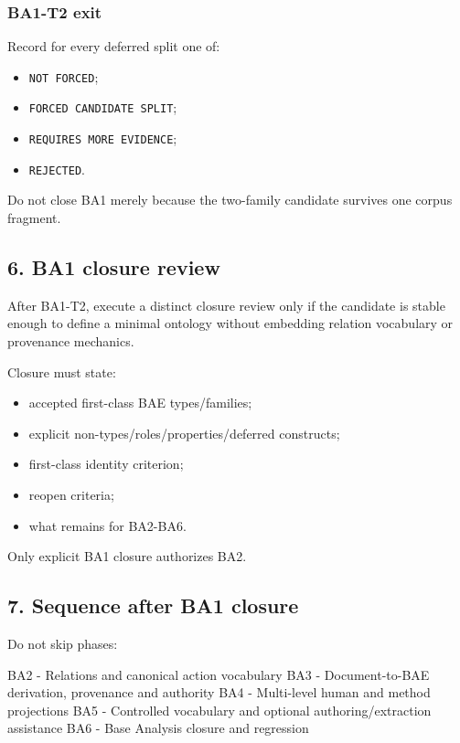 \documentclass[
]{article}
\newenvironment{Shaded}{}{}
\newcommand{\NormalTok}[1]{#1}
\providecommand{\tightlist}{%
  \setlength{\itemsep}{0pt}\setlength{\parskip}{0pt}}
\begin{document}
\subsubsection{BA1-T2 exit}\label{ba1-t2-exit}

Record for every deferred split one of:

\begin{itemize}
\tightlist
\item
  \texttt{NOT\ FORCED};
\item
  \texttt{FORCED\ CANDIDATE\ SPLIT};
\item
  \texttt{REQUIRES\ MORE\ EVIDENCE};
\item
  \texttt{REJECTED}.
\end{itemize}

Do not close BA1 merely because the two-family candidate survives one
corpus fragment.

\subsection{6. BA1 closure review}\label{6-ba1-closure-review}

After BA1-T2, execute a distinct closure review only if the candidate is
stable enough to define a minimal ontology without embedding relation
vocabulary or provenance mechanics.

Closure must state:

\begin{itemize}
\tightlist
\item
  accepted first-class BAE types/families;
\item
  explicit non-types/roles/properties/deferred constructs;
\item
  first-class identity criterion;
\item
  reopen criteria;
\item
  what remains for BA2-BA6.
\end{itemize}

Only explicit BA1 closure authorizes BA2.

\subsection{7. Sequence after BA1
closure}\label{7-sequence-after-ba1-closure}

Do not skip phases:

\begin{Shaded}
\begin{Highlighting}[]
\NormalTok{BA2 {-} Relations and canonical action vocabulary}
\NormalTok{BA3 {-} Document{-}to{-}BAE derivation, provenance and authority}
\NormalTok{BA4 {-} Multi{-}level human and method projections}
\NormalTok{BA5 {-} Controlled vocabulary and optional authoring/extraction assistance}
\NormalTok{BA6 {-} Base Analysis closure and regression}
\end{Highlighting}
\end{Shaded}
\end{document}

